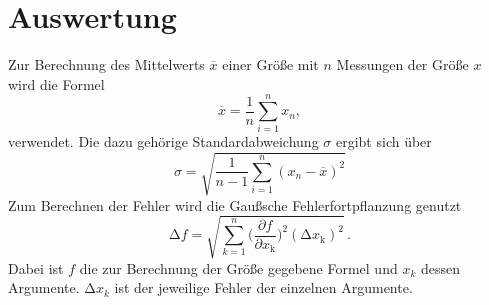 \section{Auswertung}
\label{sec:Auswertung}
Zur Berechnung des Mittelwerts $\overline{x}$ einer Größe mit $n$ Messungen der Größe $x$ wird die Formel 
\begin{equation}
  \overline{x}=\frac{1}{n}\sum_{i=1}^n x_n,
  \label{eq:Mittelwert}
\end{equation} verwendet.
Die dazu gehörige Standardabweichung $\sigma$ ergibt sich über 
\begin{equation}
  \sigma=\sqrt{\frac{1}{n-1}\sum_{i=1}^n(x_n-\overline{x})^2}
  \label{eq:Standardabweichung}
\end{equation}
Zum Berechnen der Fehler wird die Gaußsche Fehlerfortpflanzung genutzt 
\begin{equation}
\increment f=\sqrt{\sum_{k=1}^{n}\biggl(\frac{\partial f}{\partial x_\text{k}}\biggr)^2(\increment x_\text{k})^2}\,.
\label{eq:gauss}
\end{equation}
Dabei ist $f$ die zur Berechnung der Größe gegebene Formel und $x_k$ dessen Argumente.
$\increment x_k$ ist der jeweilige Fehler der einzelnen Argumente.

